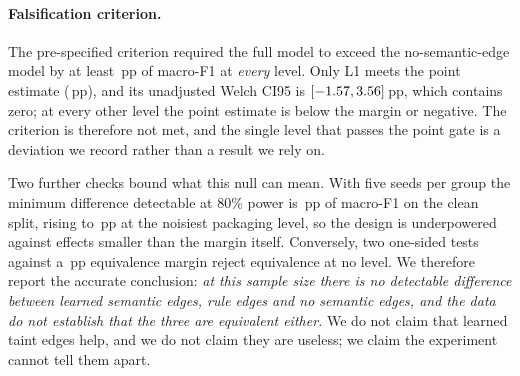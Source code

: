 \documentclass[pdflatex,sn-mathphys-num]{sn-jnl}
\begin{document}
\paragraph{Falsification criterion.} The pre-specified criterion required the
full model to exceed the no-semantic-edge model by at least
\CElevenMargin\,pp of macro-F1 at \emph{every} level. Only L1 meets the point
estimate (\CElevenLOneDeltaPp\,pp), and its unadjusted Welch CI95 is
$[-1.57, 3.56]$\,pp, which contains zero; at
every other level the point estimate is below the margin or negative. The
criterion is therefore not met, and the single level that passes the point gate
is a deviation we record rather than a result we rely on.

Two further checks bound what this null can mean. With five seeds per group the
minimum difference detectable at 80\% power is \TaintMdeMinPp\,pp of macro-F1 on
the clean split, rising to \TaintMdeMaxPp\,pp at the noisiest packaging level,
so the design is underpowered against effects smaller than the margin itself.
Conversely, two one-sided tests against a \TaintSesoiPp\,pp equivalence margin
reject equivalence at no level. We therefore report the accurate conclusion:
\emph{at this sample size there is no detectable difference between learned
semantic edges, rule edges and no semantic edges, and the data do not establish
that the three are equivalent either.} We do not claim that learned taint edges
help, and we do not claim they are useless; we claim the experiment cannot tell
them apart.
\end{document}
